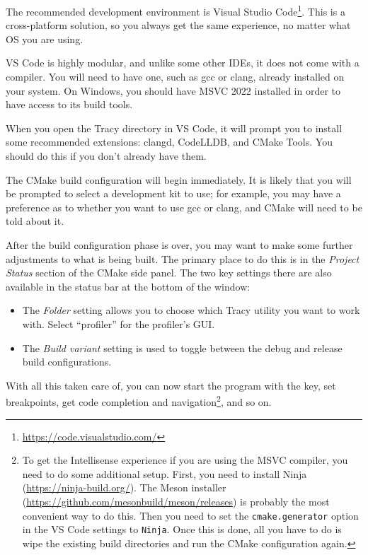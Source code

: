 \documentclass[hidelinks,titlepage,a4paper,twoside]{article}
\begin{document}
The recommended development environment is Visual Studio Code\footnote{\url{https://code.visualstudio.com/}}. This is a cross-platform solution, so you always get the same experience, no matter what OS you are using.

VS Code is highly modular, and unlike some other IDEs, it does not come with a compiler. You will need to have one, such as gcc or clang, already installed on your system. On Windows, you should have MSVC 2022 installed in order to have access to its build tools.

When you open the Tracy directory in VS Code, it will prompt you to install some recommended extensions: clangd, CodeLLDB, and CMake Tools. You should do this if you don't already have them.

The CMake build configuration will begin immediately. It is likely that you will be prompted to select a development kit to use; for example, you may have a preference as to whether you want to use gcc or clang, and CMake will need to be told about it.

After the build configuration phase is over, you may want to make some further adjustments to what is being built. The primary place to do this is in the \emph{Project Status} section of the CMake side panel. The two key settings there are also available in the status bar at the bottom of the window:

\begin{itemize}
\item The \emph{Folder} setting allows you to choose which Tracy utility you want to work with. Select \enquote{profiler} for the profiler's GUI.
\item The \emph{Build variant} setting is used to toggle between the debug and release build configurations.
\end{itemize}

With all this taken care of, you can now start the program with the  key, set breakpoints, get code completion and navigation\footnote{To get the Intellisense experience if you are using the MSVC compiler, you need to do some additional setup. First, you need to install Ninja (\url{https://ninja-build.org/}). The Meson installer (\url{https://github.com/mesonbuild/meson/releases}) is probably the most convenient way to do this. Then you need to set the \texttt{cmake.generator} option in the VS Code settings to \texttt{Ninja}. Once this is done, all you have to do is wipe the existing build directories and run the CMake configuration again.}, and so on.
\end{document}
